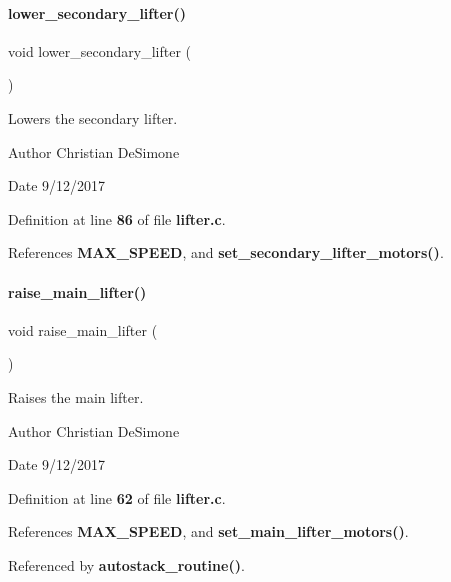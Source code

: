 \paragraph{lower\+\_\+secondary\+\_\+lifter()}
{\footnotesize\ttfamily void lower\+\_\+secondary\+\_\+lifter (\begin{DoxyParamCaption}{ }\end{DoxyParamCaption})}



Lowers the secondary lifter. 

\begin{DoxyAuthor}{Author}
Christian De\+Simone 
\end{DoxyAuthor}
\begin{DoxyDate}{Date}
9/12/2017 
\end{DoxyDate}


Definition at line \textbf{ 86} of file \textbf{ lifter.\+c}.



References \textbf{ M\+A\+X\+\_\+\+S\+P\+E\+ED}, and \textbf{ set\+\_\+secondary\+\_\+lifter\+\_\+motors()}.

\mbox{\label{lifter_8h_a2e2bd38b5b8b52378f3510368bf8aa0a}} 
\paragraph{raise\+\_\+main\+\_\+lifter()}
{\footnotesize\ttfamily void raise\+\_\+main\+\_\+lifter (\begin{DoxyParamCaption}{ }\end{DoxyParamCaption})}



Raises the main lifter. 

\begin{DoxyAuthor}{Author}
Christian De\+Simone 
\end{DoxyAuthor}
\begin{DoxyDate}{Date}
9/12/2017 
\end{DoxyDate}


Definition at line \textbf{ 62} of file \textbf{ lifter.\+c}.



References \textbf{ M\+A\+X\+\_\+\+S\+P\+E\+ED}, and \textbf{ set\+\_\+main\+\_\+lifter\+\_\+motors()}.



Referenced by \textbf{ autostack\+\_\+routine()}.

